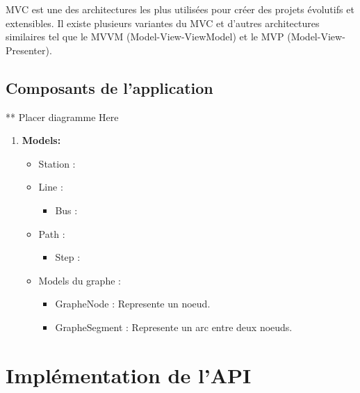 	MVC est une des architectures les plus utilisées pour créer des projets évolutifs et extensibles.	Il existe plusieurs variantes du MVC et d'autres architectures similaires tel que le MVVM (Model-View-ViewModel) et le MVP (Model-View-Presenter).
	\cite{refMVC}
	\subsection{Composants de l'application}
	** Placer diagramme Here
	
	\begin{enumerate}
	\item \textbf{Models:}
	 \begin{itemize}
		\item Station :
		\item Line :
			\begin{itemize}
			\item Bus :
			\end{itemize}
		\item Path :
			\begin{itemize}
			\item Step :
			\end{itemize}
		\item Models du graphe : 
			\begin{itemize}
			\item GrapheNode : Represente un noeud.
			\item GrapheSegment : Represente un arc entre deux noeuds.
			\end{itemize}
	\end{itemize}
	\end{enumerate}
	
	
	
\section{Implémentation de l'API}
